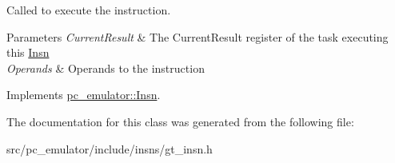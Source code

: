Called to execute the instruction. 


\begin{DoxyParams}{Parameters}
{\em Current\+Result} & The Current\+Result register of the task executing this \hyperlink{classpc__emulator_1_1Insn}{Insn} \\
\hline
{\em Operands} & Operands to the instruction \\
\hline
\end{DoxyParams}


Implements \hyperlink{classpc__emulator_1_1Insn_a103d27030e872a799e313df16c1f3d66}{pc\+\_\+emulator\+::\+Insn}.



The documentation for this class was generated from the following file\+:\begin{DoxyCompactItemize}
\item 
src/pc\+\_\+emulator/include/insns/gt\+\_\+insn.\+h\end{DoxyCompactItemize}
